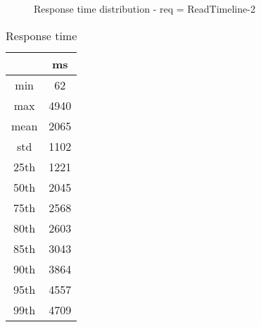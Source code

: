 \begin{minipage}{0.75\linewidth}
\begin{figure}[h]
\begin{adjustbox}{max width=1.0\linewidth, keepaspectratio}
  \end{adjustbox}
  \caption{Response time distribution - req = ReadTimeline-2}
\end{figure}
\end{minipage}\hfill\begin{minipage}{0.18\linewidth}
\begin{table}[h]
\begin{tabular}{|cc|}
\hline
\textbf{} & \textbf{ms}\\ \hline
 \Xhline{0.005\arrayrulewidth}
min & 62\\
 \Xhline{0.005\arrayrulewidth}
max & 4940\\
 \Xhline{0.005\arrayrulewidth}
mean & 2065\\
 \Xhline{0.005\arrayrulewidth}
std & 1102\\
\hline
\hline
 \Xhline{0.005\arrayrulewidth}
25th & 1221\\
 \Xhline{0.005\arrayrulewidth}
50th & 2045\\
 \Xhline{0.005\arrayrulewidth}
75th & 2568\\
 \Xhline{0.005\arrayrulewidth}
80th & 2603\\
 \Xhline{0.005\arrayrulewidth}
85th & 3043\\
 \Xhline{0.005\arrayrulewidth}
90th & 3864\\
 \Xhline{0.005\arrayrulewidth}
95th & 4557\\
 \Xhline{0.005\arrayrulewidth}
99th & 4709\\
\hline
\end{tabular}
\caption{Response time}
\end{table}
\end{minipage}\hfill